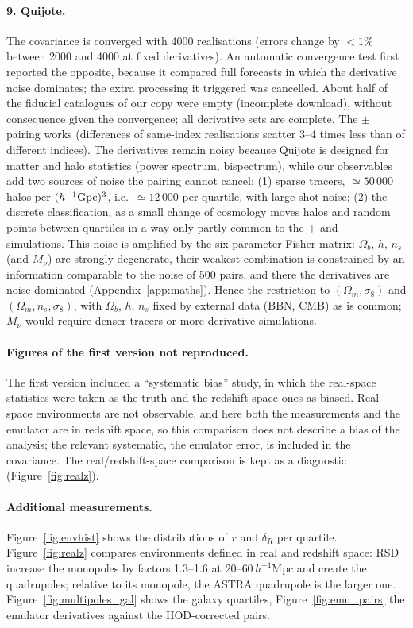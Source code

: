 \documentclass[11pt,twocolumn]{article}
\newcommand{\Mpch}{\,h^{-1}\mathrm{Mpc}}
\begin{document}
\paragraph{9. Quijote.} The covariance is converged with 4000 realisations (errors change by $<1\%$ between 2000 and 4000 at fixed derivatives). An automatic convergence test first reported the opposite, because it compared full forecasts in which the derivative noise dominates; the extra processing it triggered was cancelled. About half of the fiducial catalogues of our copy were empty (incomplete download), without consequence given the convergence; all derivative sets are complete. The $\pm$ pairing works (differences of same-index realisations scatter 3--4 times less than of different indices). The derivatives remain noisy because Quijote is designed for matter and halo statistics (power spectrum, bispectrum), while our observables add two sources of noise the pairing cannot cancel: (1) sparse tracers, $\simeq50\,000$ halos per $(h^{-1}{\rm Gpc})^3$, i.e.\ $\simeq12\,000$ per quartile, with large shot noise; (2) the discrete classification, as a small change of cosmology moves halos and random points between quartiles in a way only partly common to the $+$ and $-$ simulations. This noise is amplified by the six-parameter Fisher matrix: $\Omega_b$, $h$, $n_s$ (and $M_\nu$) are strongly degenerate, their weakest combination is constrained by an information comparable to the noise of 500 pairs, and there the derivatives are noise-dominated (Appendix~\ref{app:maths}). Hence the restriction to $(\Omega_m,\sigma_8)$ and $(\Omega_m,n_s,\sigma_8)$, with $\Omega_b$, $h$, $n_s$ fixed by external data (BBN, CMB) as is common; $M_\nu$ would require denser tracers or more derivative simulations.

\paragraph{Figures of the first version not reproduced.} The first version included a ``systematic bias'' study, in which the real-space statistics were taken as the truth and the redshift-space ones as biased. Real-space environments are not observable, and here both the measurements and the emulator are in redshift space, so this comparison does not describe a bias of the analysis; the relevant systematic, the emulator error, is included in the covariance. The real/redshift-space comparison is kept as a diagnostic (Figure~\ref{fig:realz}).

\paragraph{Additional measurements.} Figure~\ref{fig:envhist} shows the distributions of $r$ and $\delta_R$ per quartile. Figure~\ref{fig:realz} compares environments defined in real and redshift space: RSD increase the monopoles by factors 1.3--1.6 at $20$--$60\Mpch$ and create the quadrupoles; relative to its monopole, the ASTRA quadrupole is the larger one. Figure~\ref{fig:multipoles_gal} shows the galaxy quartiles, Figure~\ref{fig:emu_pairs} the emulator derivatives against the HOD-corrected pairs.
\end{document}
